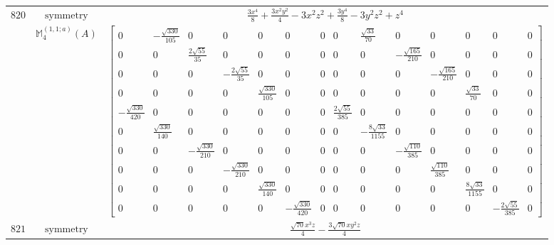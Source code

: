 \documentclass[fleqn,8pt,landscape]{jsarticle}
\begin{document}
\begin{longtable}{ccc}
$ 820 $ & $ \text{symmetry} $ & $ \frac{3 x^{4}}{8} + \frac{3 x^{2} y^{2}}{4} - 3 x^{2} z^{2} + \frac{3 y^{4}}{8} - 3 y^{2} z^{2} + z^{4} $ \\
$  $ & $ \mathbb{M}_{4}^{(1,1;a)}(A) $ & $ \begin{bmatrix} 0 & - \frac{\sqrt{330}}{105} & 0 & 0 & 0 & 0 & 0 & 0 & \frac{\sqrt{33}}{70} & 0 & 0 & 0 & 0 & 0 \\ 0 & 0 & \frac{2 \sqrt{55}}{35} & 0 & 0 & 0 & 0 & 0 & 0 & - \frac{\sqrt{165}}{210} & 0 & 0 & 0 & 0 \\ 0 & 0 & 0 & - \frac{2 \sqrt{55}}{35} & 0 & 0 & 0 & 0 & 0 & 0 & - \frac{\sqrt{165}}{210} & 0 & 0 & 0 \\ 0 & 0 & 0 & 0 & \frac{\sqrt{330}}{105} & 0 & 0 & 0 & 0 & 0 & 0 & \frac{\sqrt{33}}{70} & 0 & 0 \\ - \frac{\sqrt{330}}{420} & 0 & 0 & 0 & 0 & 0 & 0 & \frac{2 \sqrt{55}}{385} & 0 & 0 & 0 & 0 & 0 & 0 \\ 0 & \frac{\sqrt{330}}{140} & 0 & 0 & 0 & 0 & 0 & 0 & - \frac{8 \sqrt{33}}{1155} & 0 & 0 & 0 & 0 & 0 \\ 0 & 0 & - \frac{\sqrt{330}}{210} & 0 & 0 & 0 & 0 & 0 & 0 & - \frac{\sqrt{110}}{385} & 0 & 0 & 0 & 0 \\ 0 & 0 & 0 & - \frac{\sqrt{330}}{210} & 0 & 0 & 0 & 0 & 0 & 0 & \frac{\sqrt{110}}{385} & 0 & 0 & 0 \\ 0 & 0 & 0 & 0 & \frac{\sqrt{330}}{140} & 0 & 0 & 0 & 0 & 0 & 0 & \frac{8 \sqrt{33}}{1155} & 0 & 0 \\ 0 & 0 & 0 & 0 & 0 & - \frac{\sqrt{330}}{420} & 0 & 0 & 0 & 0 & 0 & 0 & - \frac{2 \sqrt{55}}{385} & 0 \end{bmatrix} $ \\ \hline
$ 821 $ & $ \text{symmetry} $ & $ \frac{\sqrt{70} x^{3} z}{4} - \frac{3 \sqrt{70} x y^{2} z}{4} $ \\

\end{longtable}
\end{document}
